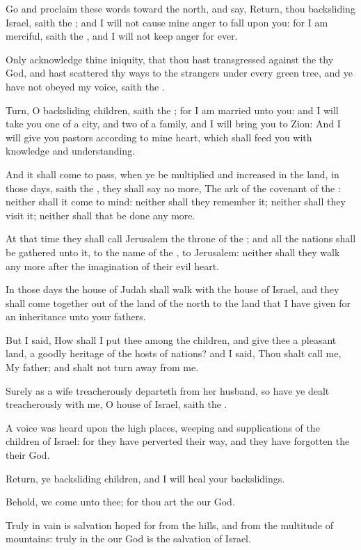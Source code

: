 \verse Go and proclaim these words toward the north, and say, Return, thou backsliding Israel, saith the \LORD; and I will not cause mine anger to fall upon you: for I am merciful, saith the \LORD, and I will not keep anger for ever.

\verse Only acknowledge thine iniquity, that thou hast transgressed against the \LORD thy God, and hast scattered thy ways to the strangers under every green tree, and ye have not obeyed my voice, saith the \LORD.

\verse Turn, O backsliding children, saith the \LORD; for I am married unto you: and I will take you one of a city, and two of a family, and I will bring you to Zion: \verse And I will give you pastors according to mine heart, which shall feed you with knowledge and understanding.

\verse And it shall come to pass, when ye be multiplied and increased in the land, in those days, saith the \LORD, they shall say no more, The ark of the covenant of the \LORD: neither shall it come to mind: neither shall they remember it; neither shall they visit it; neither shall that be done any more.

\verse At that time they shall call Jerusalem the throne of the \LORD; and all the nations shall be gathered unto it, to the name of the \LORD, to Jerusalem: neither shall they walk any more after the imagination of their evil heart.

\verse In those days the house of Judah shall walk with the house of Israel, and they shall come together out of the land of the north to the land that I have given for an inheritance unto your fathers.

\verse But I said, How shall I put thee among the children, and give thee a pleasant land, a goodly heritage of the hosts of nations? and I said, Thou shalt call me, My father; and shalt not turn away from me.

\verse Surely as a wife treacherously departeth from her husband, so have ye dealt treacherously with me, O house of Israel, saith the \LORD.

\verse A voice was heard upon the high places, weeping and supplications of the children of Israel: for they have perverted their way, and they have forgotten the \LORD their God.

\verse Return, ye backsliding children, and I will heal your backslidings.

Behold, we come unto thee; for thou art the \LORD our God.

\verse Truly in vain is salvation hoped for from the hills, and from the multitude of mountains: truly in the \LORD our God is the salvation of Israel.

